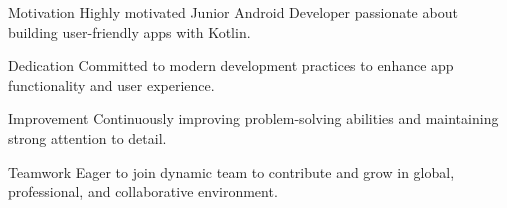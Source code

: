 \begin{cvskills}

    \cvskill
    {Motivation}
    {Highly motivated Junior Android Developer passionate about building user-friendly apps with Kotlin.}

    \cvskill
    {Dedication}
    {Committed to modern development practices to enhance app functionality and user experience.}

    \cvskill
    {Improvement}
    {Continuously improving problem-solving abilities and maintaining strong attention to detail.}

    \cvskill
    {Teamwork}
    {Eager to join dynamic team to contribute and grow in global, professional, and collaborative environment.}

\end{cvskills}
